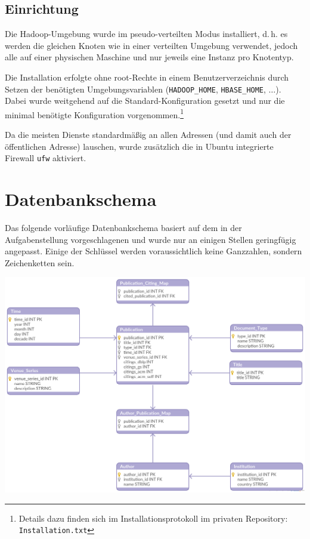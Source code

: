 \documentclass[a4paper,11pt,utf8]{scrartcl}
\begin{document}
\subsection{Einrichtung}

Die Hadoop-Umgebung wurde im pseudo-verteilten Modus installiert, d.\,h. es werden die gleichen Knoten wie in einer verteilten Umgebung verwendet, jedoch alle auf einer physischen Maschine und nur jeweils eine Instanz pro Knotentyp.

Die Installation erfolgte ohne root-Rechte in einem Benutzerverzeichnis durch Setzen der benötigten Umgebungsvariablen (\texttt{HADOOP\_HOME}, \texttt{HBASE\_HOME}, $\dots$). Dabei wurde weitgehend auf die Standard-Konfiguration gesetzt und nur die minimal benötigte Konfiguration vorgenommen.\footnote{Details dazu finden sich im Installationsprotokoll im privaten Repository: \texttt{Installation.txt}}

Da die meisten Dienste standardmäßig an allen Adressen (und damit auch der öffentlichen Adresse) lauschen, wurde zusätzlich die in Ubuntu integrierte Firewall \texttt{ufw} aktiviert.

\section{Datenbankschema}

Das folgende vorläufige Datenbankschema basiert auf dem in der Aufgabenstellung vorgeschlagenen und wurde nur an einigen Stellen geringfügig angepasst. Einige der Schlüssel werden voraussichtlich keine Ganzzahlen, sondern Zeichenketten sein.

\noindent
\includegraphics[width=\textwidth]{pics/schema.png}
\end{document}
